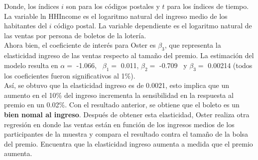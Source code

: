 Donde, los índices $i$ son para los códigos postales y $t$ para los índices de tiempo. La variable ln HHIncome es el logaritmo natural del ingreso medio de los habitantes del $i$ código postal. La variable dependiente es el logaritmo natural de las ventas por persona de boletos de la lotería. \\

Ahora bien, el coeficiente de interés para Oster es $\beta_3$, que representa la elasticidad ingreso de las ventas respecto al tamaño del premio. La estimación del modelo resulta en $\alpha = $ -1.066, \ $\beta_1 = $ 0.011, $\beta_2 = $ -0.709 \ y $\beta_3 = $ 0.00214 (todos los coeficientes fueron significativos al 1\%). \\

Así, se obtuvo que la elasticidad ingreso es de 0.0021, esto implica que un aumento en el 10\% del ingreso incrementa la sensibilidad en la respuesta al premio en un 0.02\%. Con el resultado anterior, se obtiene que el boleto es un \textbf{bien nomal al ingreso}. Después de obtener esta elasticidad, Oster realiza otra regresión en donde las ventas están en función de los ingresos medios de los participantes de la muestra y compara el resultado contra el tamaño de la bolsa del premio. Encuentra que la elasticidad ingreso aumenta a medida que el premio aumenta.   










% 
    

